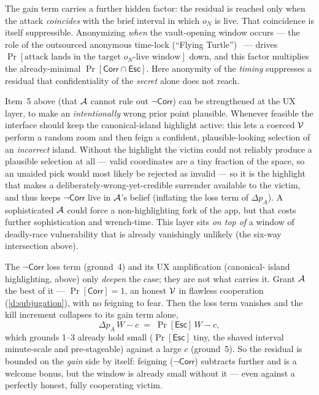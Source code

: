 \begin{remark}
The gain term carries a further hidden factor: the residual is reached only when
the attack \emph{coincides} with the brief interval in which $o_N$ is live. That
coincidence is itself suppressible. Anonymizing \emph{when} the vault-opening
window occurs --- the role of the outsourced anonymous time-lock (``Flying
Turtle'')~\cite{gw-flyingturtle} --- drives
$\Pr[\text{attack lands in the target } o_N\text{-live window}]$ down, and this factor
multiplies the already-minimal $\Pr[\mathsf{Corr}\cap\mathsf{Esc}]$. Here anonymity
of the \emph{timing} suppresses a residual that confidentiality of the \emph{secret}
alone does not reach.
\end{remark}

\begin{remark}
Item~5 above (that $\mathcal{A}$ cannot rule out $\neg\mathsf{Corr}$) can be
strengthened at the UX layer, to make an \emph{intentionally} wrong prior point
plausible. Whenever feasible the interface should keep the canonical-island
highlight active: this lets a coerced $\mathcal{V}$ perform a random zoom and then
feign a confident, plausible-looking selection of an \emph{incorrect} island.
Without the highlight the victim could not reliably produce a plausible selection
at all --- valid coordinates are a tiny fraction of the space, so an unaided pick
would most likely be rejected as invalid --- so it is the highlight that makes a
deliberately-wrong-yet-credible surrender available to the victim, and thus keeps
$\neg\mathsf{Corr}$ live in $\mathcal{A}$'s belief (inflating the loss term of
$\Delta p_A$). A sophisticated $\mathcal{A}$ could force a non-highlighting fork of
the app, but that costs further sophistication and wrench-time. This layer sits
\emph{on top of} a window of deadly-race vulnerability that is already
vanishingly unlikely (the six-way intersection above).
\end{remark}

\begin{remark}
The $\neg\mathsf{Corr}$ loss term (ground~4) and its UX amplification (canonical-
island highlighting, above) only \emph{deepen} the case; they are not what carries
it. Grant $\mathcal{A}$ the best of it --- $\Pr[\mathsf{Corr}] = 1$, an honest
$\mathcal{V}$ in flawless cooperation (\ref{d:subjugation}), with no feigning to fear. Then the loss
term vanishes and the kill increment collapses to its gain term alone,
\[
  \Delta p_A\,W - c \;=\; \Pr[\mathsf{Esc}]\,W - c,
\]
which grounds 1--3 already hold small ($\Pr[\mathsf{Esc}]$ tiny, the shaved
interval minute-scale and pre-stageable) against a large $c$ (ground~5). So the
residual is bounded on the \emph{gain} side by itself: feigning ($\neg\mathsf{Corr}$)
subtracts further and is a welcome bonus, but the window is already small without
it --- even against a perfectly honest, fully cooperating victim.
\end{remark}


